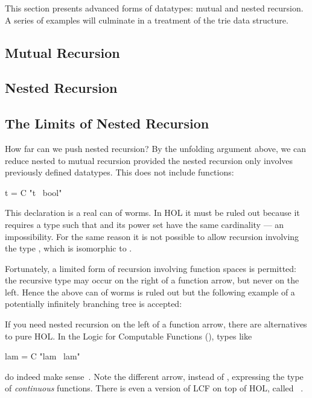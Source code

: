 This section presents advanced forms of datatypes: mutual and nested
recursion.  A series of examples will culminate in a treatment of the trie
data structure.


\subsection{Mutual Recursion}
\label{sec:datatype-mut-rec}



\subsection{Nested Recursion}
\label{sec:nested-datatype}

{\makeatother}


\subsection{The Limits of Nested Recursion}
\label{sec:nested-fun-datatype}

How far can we push nested recursion? By the unfolding argument above, we can
reduce nested to mutual recursion provided the nested recursion only involves
previously defined datatypes. This does not include functions:
\begin{isabelle}
 t = C "t \isasymRightarrow\ bool"
\end{isabelle}
This declaration is a real can of worms.
In HOL it must be ruled out because it requires a type
 such that  and its power set  have the
same cardinality --- an impossibility. For the same reason it is not possible
to allow recursion involving the type , which is isomorphic to
.

Fortunately, a limited form of recursion
involving function spaces is permitted: the recursive type may occur on the
right of a function arrow, but never on the left. Hence the above can of worms
is ruled out but the following example of a potentially 
%
infinitely branching tree is accepted:
\smallskip



If you need nested recursion on the left of a function arrow, there are
alternatives to pure HOL\@.  In the Logic for Computable Functions 
(), types like
\begin{isabelle}
 lam = C "lam \isasymrightarrow\ lam"
\end{isabelle}
do indeed make sense~\cite{paulson87}.  Note the different arrow,
\isa{\isasymrightarrow} instead of \isa{\isasymRightarrow},
expressing the type of \emph{continuous} functions. 
There is even a version of LCF on top of HOL,
called ~\cite{MuellerNvOS99}.


